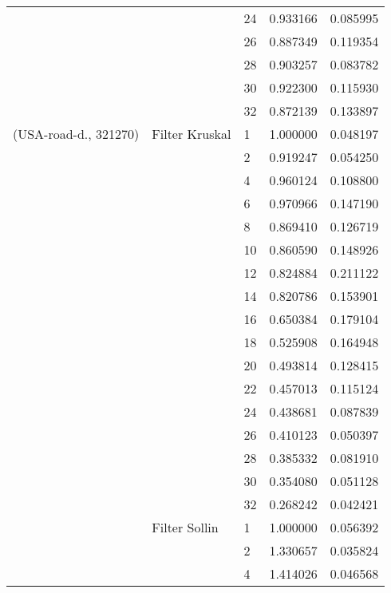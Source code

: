 \begin{tabular}{lllrr}
                      &            & 24 &  0.933166 &  0.085995 \\
                      &            & 26 &  0.887349 &  0.119354 \\
                      &            & 28 &  0.903257 &  0.083782 \\
                      &            & 30 &  0.922300 &  0.115930 \\
                      &            & 32 &  0.872139 &  0.133897 \\
(USA-road-d., 321270) & Filter Kruskal & 1  &  1.000000 &  0.048197 \\
                      &            & 2  &  0.919247 &  0.054250 \\
                      &            & 4  &  0.960124 &  0.108800 \\
                      &            & 6  &  0.970966 &  0.147190 \\
                      &            & 8  &  0.869410 &  0.126719 \\
                      &            & 10 &  0.860590 &  0.148926 \\
                      &            & 12 &  0.824884 &  0.211122 \\
                      &            & 14 &  0.820786 &  0.153901 \\
                      &            & 16 &  0.650384 &  0.179104 \\
                      &            & 18 &  0.525908 &  0.164948 \\
                      &            & 20 &  0.493814 &  0.128415 \\
                      &            & 22 &  0.457013 &  0.115124 \\
                      &            & 24 &  0.438681 &  0.087839 \\
                      &            & 26 &  0.410123 &  0.050397 \\
                      &            & 28 &  0.385332 &  0.081910 \\
                      &            & 30 &  0.354080 &  0.051128 \\
                      &            & 32 &  0.268242 &  0.042421 \\
                      & Filter Sollin & 1  &  1.000000 &  0.056392 \\
                      &            & 2  &  1.330657 &  0.035824 \\
                      &            & 4  &  1.414026 &  0.046568 \\

\end{tabular}
